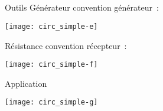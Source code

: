 \documentclass[a4paper, 12pt, final, garamond]{book}
\begin{document}
\subsection{}
\begin{tcbraster}[raster columns=2, raster equal height=rows]
    \begin{NCrapp}{Outils}
        Générateur convention générateur~: \smallbreak
        \vspace{-12pt}
        \begin{center}
            \texttt{[image: circ\_simple-e]}
        \end{center}
        Résistance convention récepteur~: \smallbreak
        \vspace{-12pt}
        \begin{center}
            \texttt{[image: circ\_simple-f]}
        \end{center}
    \end{NCrapp}
    \begin{NCexem}{Application}
        \begin{center}
            \texttt{[image: circ\_simple-g]}
        \end{center}
    \end{NCexem}
\end{tcbraster}
\end{document}
